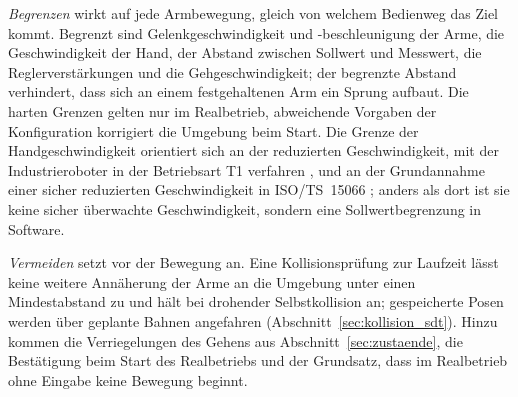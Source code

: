\emph{Begrenzen} wirkt auf jede Armbewegung, gleich von welchem Bedienweg das Ziel kommt.
Begrenzt sind Gelenkgeschwindigkeit und -beschleunigung der Arme, die Geschwindigkeit der Hand, der Abstand zwischen Sollwert und Messwert, die Reglerverstärkungen und die Gehgeschwindigkeit; der begrenzte Abstand verhindert, dass sich an einem festgehaltenen Arm ein Sprung aufbaut.
Die harten Grenzen gelten nur im Realbetrieb, abweichende Vorgaben der Konfiguration korrigiert die Umgebung beim Start.
Die Grenze der Handgeschwindigkeit orientiert sich an der reduzierten Geschwindigkeit, mit der Industrieroboter in der Betriebsart T1 verfahren \cite{DGUV2015}, und an der Grundannahme einer sicher reduzierten Geschwindigkeit in ISO/TS~15066 \cite{Villani2018}; anders als dort ist sie keine sicher überwachte Geschwindigkeit, sondern eine Sollwertbegrenzung in Software.

\emph{Vermeiden} setzt vor der Bewegung an.
Eine Kollisionsprüfung zur Laufzeit lässt keine weitere Annäherung der Arme an die Umgebung unter einen Mindestabstand zu und hält bei drohender Selbstkollision an; gespeicherte Posen werden über geplante Bahnen angefahren (Abschnitt~\ref{sec:kollision_sdt}).
Hinzu kommen die Verriegelungen des Gehens aus Abschnitt~\ref{sec:zustaende}, die Bestätigung beim Start des Realbetriebs und der Grundsatz, dass im Realbetrieb ohne Eingabe keine Bewegung beginnt.

